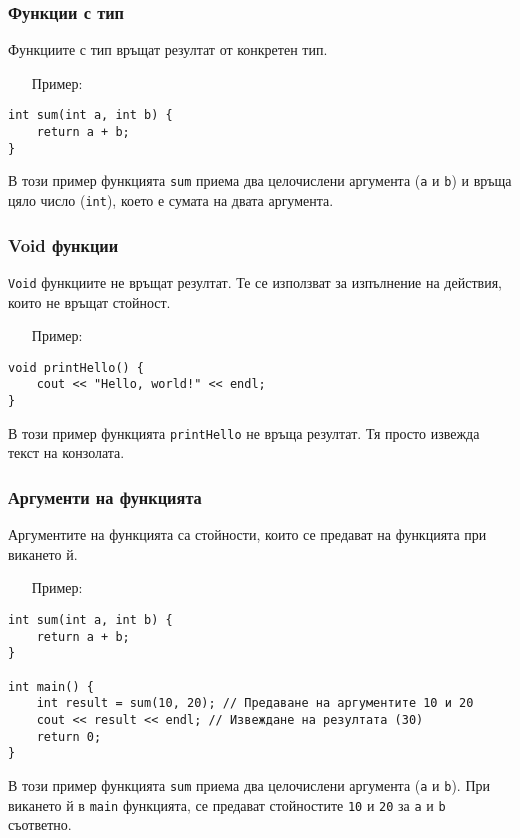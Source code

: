 \documentclass[oneside]{book}
\newcommand*{\code}[1]{\texttt{#1}}
\begin{document}
\subsubsection{Функции с тип}
Функциите с тип връщат резултат от конкретен тип.

\begin{itemize}
    \item[Пример:]
\end{itemize}
\begin{mdframed}\begin{lstlisting}
int sum(int a, int b) {
    return a + b;
}
\end{lstlisting}\end{mdframed}
В този пример функцията \code{sum} приема два целочислени аргумента (\code{a} и \code{b}) и връща цяло число (\code{int}), което е сумата на двата аргумента.

\subsubsection{Void функции}
\code{Void} функциите не връщат резултат. Те се използват за изпълнение на действия, които не връщат стойност.

\begin{itemize}
    \item[Пример:]
\end{itemize}
\begin{mdframed}\begin{lstlisting}
void printHello() {
    cout << "Hello, world!" << endl;
}
\end{lstlisting}\end{mdframed}
В този пример функцията \code{printHello} не връща резултат. Тя просто извежда текст на конзолата.

\subsubsection{Аргументи на функцията}
Аргументите на функцията са стойности, които се предават на функцията при викането й.
\pagebreak
\begin{itemize}
    \item[Пример:]
\end{itemize}
\begin{mdframed}\begin{lstlisting}
int sum(int a, int b) {
    return a + b;
}

int main() {
    int result = sum(10, 20); // Предаване на аргументите 10 и 20
    cout << result << endl; // Извеждане на резултата (30)
    return 0;
}
\end{lstlisting}\end{mdframed}
В този пример функцията \code{sum} приема два целочислени аргумента (\code{a} и \code{b}). При викането й в \code{main} функцията, се предават стойностите \code{10} и \code{20} за \code{a} и \code{b} съответно.
\end{document}
